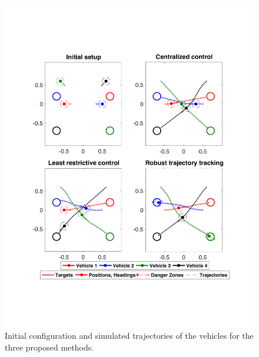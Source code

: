 \begin{figure}[h!]
  \centering
  \includegraphics[width=0.7\columnwidth]{"fig/allTrajs"}
  \caption{Initial configuration and simulated trajectories of the vehicles for the three proposed methods.}
  \label{fig:allTrajs}
\end{figure}

